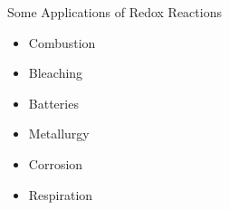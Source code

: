 \documentclass[handout]{beamer}
\begin{document}
\begin{frame}{Some Applications of Redox Reactions}
	\begin{itemize}
		\item Combustion

			\begin{center}
			\end{center}

		\item Bleaching
		\item Batteries

			\begin{center}
			\end{center}

		\item Metallurgy

			\begin{center}
			\end{center}

		\item Corrosion
			
			\begin{center}
			\end{center}

		\item Respiration
			
			\begin{center}
			\end{center}
	\end{itemize}
\end{frame}
\end{document}
